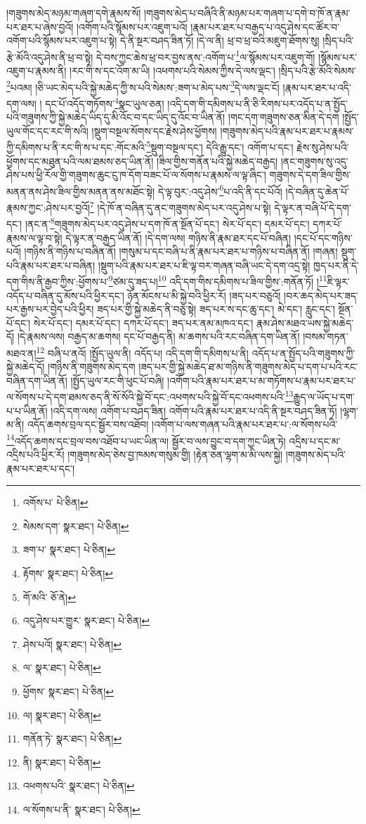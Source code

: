 །གཟུགས་མེད་མཉམ་གཞག་དགེ་རྣམས་སོ། །གཟུགས་མེད་པ་བཞིའི་ནི་མཉམ་པར་གཞག་པ་དགེ་བ་ཁོ་ན་རྣམ་པར་ཐར་པ་ཞེས་བྱའོ། །འགོག་པའི་སྙོམས་པར་འཇུག་པའོ། །རྣམ་པར་ཐར་པ་བརྒྱད་པ་འདུ་ཤེས་དང་ཚོར་བ་འགོག་པའི་སྙོམས་པར་འཇུག་པ་སྟེ། དེ་ནི་སྔར་བཤད་ཟིན་ཏོ། །དེ་ལ་ནི། ཕྲ་བ་ཕྲ་བའི་མཇུག་ཐོགས་སུ། །སྲིད་པའི་རྩེ་མོའི་འདུ་ཤེས་ནི་ཕྲ་བ་སྟེ། དེ་བས་ཀྱང་ཆེས་ཕྲ་བར་བྱས་ནས་:འགོག་པ་\footnote{འགོས་པ་  པེ་ཅིན། }ལ་སྙོམས་པར་འཇུག་གོ། །སྙོམས་པར་འཇུག་པ་རྣམས་ནི། །རང་གི་ས་དང་འོག་མ་ཡི། །འཕགས་པའི་སེམས་ཀྱིས་དེ་ལས་ལྡང་། །སྲིད་པའི་རྩེ་མོའི་སེམས་\footnote{སེམས་དག་  སྣར་ཐང་།  པེ་ཅིན། }པའམ། །ཅི་ཡང་མེད་པའི་སྐྱེ་མཆེད་ཀྱི་ས་པའི་སེམས་:ཟག་པ་མེད་པས་\footnote{ཟག་པ་  སྣར་ཐང་།  པེ་ཅིན། }དེ་ལས་ལྡང་ངོ། །རྣམ་པར་ཐར་པ་འདི་དག་ལས། །
དང་པོ་འདོད་གཏོགས་\footnote{རྟོགས་  སྣར་ཐང་།  པེ་ཅིན། }སྣང་ཡུལ་ཅན། །འདི་དག་གི་དམིགས་པ་ནི་ཅི་རིགས་པར་འདོད་པ་ན་སྤྱོད་པའི་གཟུགས་ཀྱི་སྐྱེ་མཆེད་ཡིད་དུ་མི་འོང་བ་དང་ཡིད་དུ་འོང་བ་ཡིན་ནོ། །གང་དག་གཟུགས་ཅན་མིན་དེ་དག །སྤྱོད་ཡུལ་གོང་དང་རང་གི་སའི། །སྡུག་བསྔལ་སོགས་དང་རྗེས་ཤེས་ཕྱོགས། །གཟུགས་མེད་པའི་རྣམ་པར་ཐར་པ་རྣམས་ཀྱི་དམིགས་པ་ནི་རང་གི་ས་པ་དང་:གོང་མའི་\footnote{གོ་མའི་  ཅོ་ནེ། }སྡུག་བསྔལ་དང་། དེའི་རྒྱུ་དང་། འགོག་པ་དང་། རྗེས་སུ་ཤེས་པའི་ཕྱོགས་དང་མཐུན་པའི་ལམ་ཐམས་ཅད་ཡིན་ནོ། །ཟིལ་གྱིས་གནོན་པའི་སྐྱེ་མཆེད་བརྒྱད། །ནང་གཟུགས་སུ་འདུ་ཤེས་པས་ཕྱི་རོལ་གྱི་གཟུགས་ཆུང་ངུ་ཁ་དོག་བཟང་པོ་ལ་སོགས་པ་རྣམས་ལ་ལྟ་ཞིང་། གཟུགས་དེ་དག་ཟིལ་གྱིས་མནན་ནས་ཤེས་ཟིལ་གྱིས་མནན་ནས་མཐོང་སྟེ། དེ་ལྟ་བུར་:འདུ་ཤེས་\footnote{འདུ་ཤེས་པར་གྱུར་  སྣར་ཐང་།  པེ་ཅིན། }པ་འདི་ནི་དང་པོའོ། །དེ་བཞིན་དུ་ཆེན་པོ་རྣམས་ཀྱང་:ཤེས་པར་བྱའོ།\footnote{ཤེས་པའོ།  སྣར་ཐང་།  པེ་ཅིན། } །དེ་ཁོ་ན་བཞིན་དུ་ནང་གཟུགས་མེད་པར་འདུ་ཤེས་པ་སྟེ། དེ་ལྟར་ན་བཞི་པོ་དེ་དག་དང་། །ནང་ན་\footnote{ལ་  སྣར་ཐང་།  པེ་ཅིན། }གཟུགས་མེད་པར་འདུ་ཤེས་པ་དག་ཁོ་ན་སྔོན་པོ་དང་། སེར་པོ་དང་། དམར་པོ་དང་། དཀར་པོ་རྣམས་ལ་ལྟ་བ་སྟེ། དེ་ལྟར་ན་བརྒྱད་ཡིན་ནོ། །དེ་དག་ལས། གཉིས་ནི་རྣམ་ཐར་དང་པོ་བཞིན། །དང་པོ་དང་གཉིས་པའོ། །གཉིས་ནི་གཉིས་པ་བཞིན་ནོ། །གསུམ་པ་དང་བཞི་པ་ནི་རྣམ་པར་ཐར་པ་གཉིས་པ་བཞིན་ནོ། །གཞན། སྡུག་པའི་རྣམ་པར་ཐར་པ་བཞིན། །སྡུག་པའི་རྣམ་པར་ཐར་པ་ཇི་ལྟ་བར་གཞན་བཞི་ཡང་དེ་དག་འདྲ་སྟེ། ཁྱད་པར་ནི་དེ་དག་གིས་ནི་རྒྱབ་ཀྱིས་:ཕྱོགས་པ་\footnote{ཕྱོགས་  སྣར་ཐང་།  པེ་ཅིན། }ཙམ་དུ་ཟད་པ།\footnote{ལ།  སྣར་ཐང་།  པེ་ཅིན། } འདི་དག་གིས་དམིགས་པ་ཟིལ་གྱིས་:གནོན་ཏོ། །\footnote{གནོན་ཏེ་  སྣར་ཐང་།  པེ་ཅིན། }ཇི་ལྟར་འདོད་པ་བཞིན་དུ་མོས་པའི་ཕྱིར་དང་། ཉོན་མོངས་པ་མི་སྐྱེ་བའི་ཕྱིར་རོ། །ཟད་པར་བཅུའོ། །བར་ཆད་མེད་པར་ཟད་པར་རྒྱས་པར་བྱེད་པའི་ཕྱིར། ཟད་པར་གྱི་སྐྱེ་མཆེད་ནི་བཅུ་སྟེ། ཟད་པར་ས་དང་ཆུ་དང་། མེ་དང་། རླུང་དང་། སྔོན་པོ་དང་། སེར་པོ་དང་། དམར་པོ་དང་། དཀར་པོ་དང་། ཟད་པར་ནམ་མཁའ་དང་། རྣམ་ཤེས་མཐའ་ཡས་སྐྱེ་མཆེད་དོ། །དེ་རྣམས་ལས། བརྒྱད་མ་ཆགས། དང་པོ་བརྒྱད་ནི། མ་ཆགས་པའི་རང་བཞིན་དག་ཡིན་ནོ། །བསམ་གཏན་མཐའ་ན།\footnote{ནི།  སྣར་ཐང་།  པེ་ཅིན། } བཞི་པ་ནའོ། །སྤྱོད་ཡུལ་ནི། འདོད་པ། འདི་དག་གི་དམིགས་པ་ནི། འདོད་པ་ན་སྤྱོད་པའི་གཟུགས་ཀྱི་སྐྱེ་མཆེད་དོ། །གཉིས་ནི་གཟུགས་མེད་དག །ཟད་པར་གྱི་སྐྱེ་མཆེད་ཐ་མ་གཉིས་ནི་གཟུགས་མེད་པ་དག་པ་པའི་རང་བཞིན་དག་ཡིན་ནོ། །སྤྱོད་ཡུལ་རང་གི་ཕུང་པོ་བཞི། །འགོག་པའི་རྣམ་པར་ཐར་པ་མ་གཏོགས་པ་རྣམ་པར་ཐར་པ་ལ་སོགས་པ་དེ་དག་ཐམས་ཅད་ནི་སོ་སོའི་སྐྱེ་བོ་དང་:འཕགས་པའི་སྐྱེ་བོ་དང་འཕགས་པའི་\footnote{འཕགས་པའི་  སྣར་ཐང་།  པེ་ཅིན། }རྒྱུད་ལ་ཡོད་པ་དག་པ་པ་ཡིན་ནོ། །འདི་དག་ལས། འགོག་པ་བཤད་ཟིན། འགོག་པའི་རྣམ་པར་ཐར་པ་འདི་ནི་སྔར་བཤད་ཟིན་ཏོ། །ལྷག་མ་ནི། འདོད་ཆགས་བྲལ་དང་སྦྱོར་བས་འཐོབ། །འགོག་པ་ལས་གཞན་པའི་རྣམ་པར་ཐར་པ་:ལ་སོགས་པའི་\footnote{ལ་སོགས་པ་ནི་  སྣར་ཐང་།  པེ་ཅིན། }འདོད་ཆགས་དང་བྲལ་བས་འཐོབ་པ་ཡང་ཡིན་ལ། སྦྱོར་བ་ལས་བྱུང་བ་དག་ཀྱང་ཡིན་ཏེ། འདྲིས་པ་དང་མ་འདྲིས་པའི་ཕྱིར་རོ། །གཟུགས་མེད་ཅེས་བྱ་ཁམས་གསུམ་གྱི། །རྟེན་ཅན་ལྷག་མ་མི་ལས་སྐྱེ། །གཟུགས་མེད་པའི་རྣམ་པར་ཐར་པ་དང་། 